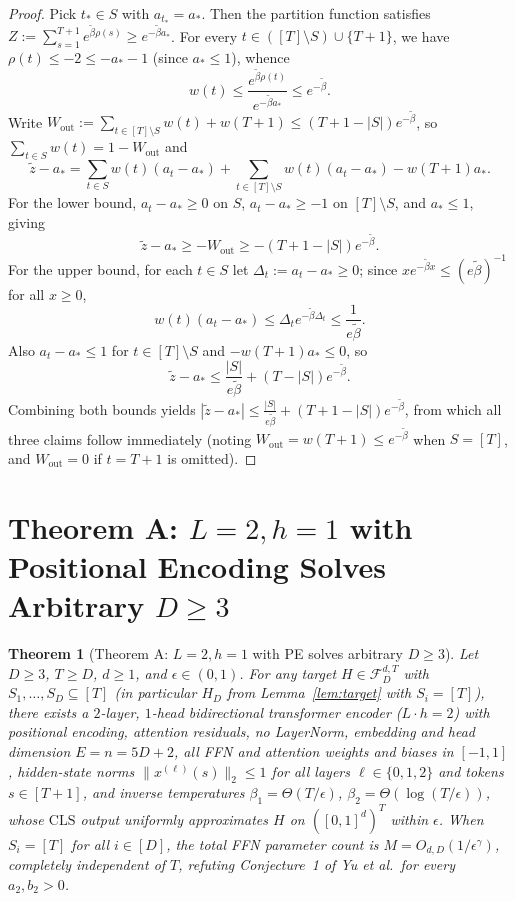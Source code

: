 \documentclass[11pt]{article}
\theoremstyle{plain}
\newtheorem{theorem}{Theorem}
\theoremstyle{definition}
\theoremstyle{remark}
\newcommand{\1}{\mathbf{1}}
\newcommand{\CLS}{\mathrm{CLS}}
\begin{document}
\begin{proof}
Pick $t_* \in S$ with $a_{t_*} = a_*$. Then the partition function satisfies $Z := \sum_{s=1}^{T+1} e^{\tilde{\beta}\rho(s)} \ge e^{-\tilde{\beta} a_*}$. For every $t \in ([T]\setminus S) \cup \{T+1\}$, we have $\rho(t) \le -2 \le -a_* - 1$ (since $a_* \le 1$), whence
\[
w(t) \le \frac{e^{\tilde{\beta}\rho(t)}}{e^{-\tilde{\beta} a_*}} \le e^{-\tilde{\beta}}.
\]
Write $W_{\mathrm{out}} := \sum_{t \in [T]\setminus S} w(t) + w(T+1) \le (T + 1 - |S|)e^{-\tilde{\beta}}$, so $\sum_{t \in S} w(t) = 1 - W_{\mathrm{out}}$ and
\[
\tilde{z} - a_* = \sum_{t \in S} w(t)(a_t - a_*) + \sum_{t \in [T]\setminus S} w(t)(a_t - a_*) - w(T+1) a_*.
\]
For the lower bound, $a_t - a_* \ge 0$ on $S$, $a_t - a_* \ge -1$ on $[T]\setminus S$, and $a_* \le 1$, giving
\[
\tilde{z} - a_* \ge -W_{\mathrm{out}} \ge -(T + 1 - |S|)e^{-\tilde{\beta}}.
\]
For the upper bound, for each $t \in S$ let $\Delta_t := a_t - a_* \ge 0$; since $x e^{-\tilde{\beta} x} \le (e\tilde{\beta})^{-1}$ for all $x \ge 0$,
\[
w(t)(a_t - a_*) \le \Delta_t e^{-\tilde{\beta}\Delta_t} \le \frac{1}{e\tilde{\beta}}.
\]
Also $a_t - a_* \le 1$ for $t \in [T]\setminus S$ and $-w(T+1)a_* \le 0$, so
\[
\tilde{z} - a_* \le \frac{|S|}{e\tilde{\beta}} + (T - |S|)e^{-\tilde{\beta}}.
\]
Combining both bounds yields $|\tilde{z} - a_*| \le \frac{|S|}{e\tilde{\beta}} + (T + 1 - |S|)e^{-\tilde{\beta}}$, from which all three claims follow immediately (noting $W_{\mathrm{out}} = w(T+1) \le e^{-\tilde{\beta}}$ when $S = [T]$, and $W_{\mathrm{out}} = 0$ if $t = T+1$ is omitted).
\end{proof}

\section{Theorem A: $L = 2, h = 1$ with Positional Encoding Solves Arbitrary $D \ge 3$}

\begin{theorem}[Theorem A: $L=2, h=1$ with PE solves arbitrary $D \ge 3$]\label{thm:A}
Let $D \ge 3$, $T \ge D$, $d \ge 1$, and $\epsilon \in (0, 1)$. For any target $H \in \mathcal{F}_D^{d,T}$ with $S_1, \dots, S_D \subseteq [T]$ (in particular $H_D$ from Lemma~\ref{lem:target} with $S_i = [T]$), there exists a $2$-layer, $1$-head bidirectional transformer encoder ($L \cdot h = 2$) with positional encoding, attention residuals, no LayerNorm, embedding and head dimension $E = n = 5D + 2$, all FFN and attention weights and biases in $[-1,1]$, hidden-state norms $\|x^{(\ell)}(s)\|_2 \le 1$ for all layers $\ell \in \{0, 1, 2\}$ and tokens $s \in [T+1]$, and inverse temperatures $\beta_1 = \Theta(T/\epsilon)$, $\beta_2 = \Theta(\log(T/\epsilon))$, whose $\CLS$ output uniformly approximates $H$ on $([0,1]^d)^T$ within $\epsilon$. When $S_i = [T]$ for all $i \in [D]$, the total FFN parameter count is $M = O_{d,D}(1/\epsilon^\gamma)$, completely independent of $T$, refuting Conjecture~1 of Yu et al.\ for every $a_2, b_2 > 0$.
\end{theorem}
\end{document}
